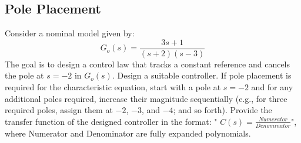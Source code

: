 \documentclass[12pt]{article}
\begin{document}
\clearpage
\subsection{Pole Placement}

Consider a nominal model given by:
\begin{equation}
G_o(s) = \frac{3s + 1}{(s + 2)(s - 3)}
\end{equation}
The goal is to design a control law that tracks a constant reference and cancels the pole at \(s = -2\) in \(G_o(s)\). Design a suitable controller. If pole placement is required for the characteristic equation, start with a pole at \(s = -2\) and for any additional poles required, increase their magnitude sequentially (e.g., for three required poles, assign them at \(-2\), \(-3\), and \(-4\); and so forth). Provide the transfer function of the designed controller in the format: " \(C(s) = \frac{Numerator}{Denominator}\)", where Numerator and Denominator are fully expanded polynomials.
\end{document}
